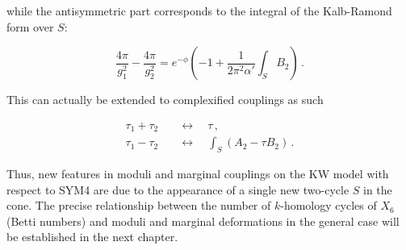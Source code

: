while the antisymmetric part corresponds to the integral of the Kalb-Ramond form over $S$:

\begin{equation}	
	\frac{4\pi}{g_1^2} - \frac{4\pi}{g_2^2} = e^{-\phi} \left( -1 + \frac{1}{2\pi^2 \alpha'} \int_{S} B_2 \right)\,.
	\label{}
\end{equation}

This can actually be extended to complexified couplings as such

\begin{align}
	\tau_1 + \tau_2 \quad &\longleftrightarrow \quad \tau\,, \\
	\tau_1 - \tau_2 \quad &\longleftrightarrow \quad \int_{S} (A_2 -  \tau B_2)\,.
\end{align}

Thus, new features in moduli and marginal couplings on the KW model with respect to SYM4 are due to the appearance of a single new two-cycle $S$ in the cone. The precise relationship between the number of $k$-homology cycles of $X_6$ (Betti numbers) and moduli and marginal deformations in the general case will be established in the next chapter.

